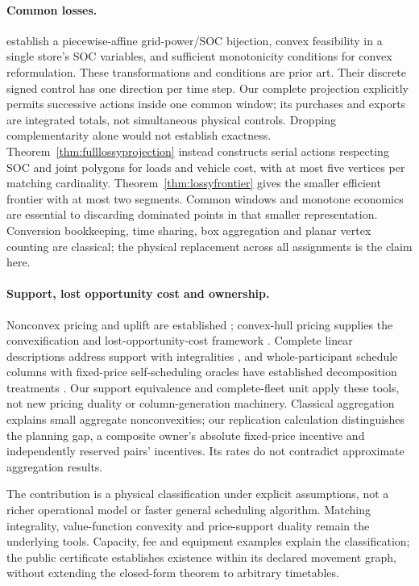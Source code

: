 \paragraph{Common losses.}
\citet[Theorems 1--3]{altahaBitar2024lossy} establish a piecewise-affine
grid-power/SOC bijection, convex feasibility in a single store's SOC variables,
and sufficient monotonicity conditions for convex reformulation. These
transformations and conditions are prior art. Their discrete signed control
has one direction per time step. Our complete projection explicitly permits
successive actions inside one common window; its purchases and exports are
integrated totals, not simultaneous physical controls. Dropping complementarity
alone would not establish exactness. Theorem~\ref{thm:fulllossyprojection}
instead constructs serial actions respecting SOC and joint polygons for
loads and vehicle cost, with at most five vertices per matching cardinality.
Theorem~\ref{thm:lossyfrontier} gives the smaller efficient frontier with at
most two segments. Common windows and monotone economics are essential to
discarding dominated points in that smaller representation. Conversion
bookkeeping, time sharing, box aggregation and planar vertex counting are
classical; the physical replacement across all assignments is the claim here.

\paragraph{Support, lost opportunity cost and ownership.}
Nonconvex pricing and uplift are established
\citep{oneill2005,gribikHoganPope2007}; convex-hull pricing supplies the
convexification and lost-opportunity-cost framework
\citep{schiro2016,huaBaldick2017}. Complete linear descriptions address
support with integralities \citep{huembs2022complete}, and whole-participant
schedule columns with fixed-price self-scheduling oracles have established
decomposition treatments \citep{andrianesis2022hull}. Our support equivalence
and complete-fleet unit apply these tools, not new pricing duality or
column-generation machinery. Classical aggregation
\citep{starr1969,hreinsson2021} explains small aggregate nonconvexities;
our replication calculation distinguishes the planning gap, a composite
owner's absolute fixed-price incentive and independently reserved pairs'
incentives. Its rates do not contradict approximate aggregation results.

The contribution is a physical classification under explicit assumptions,
not a richer operational model or faster general scheduling algorithm.
Matching integrality, value-function convexity and price-support duality
remain the underlying tools. Capacity, fee and equipment examples explain
the classification; the public certificate establishes existence within
its declared movement graph, without extending the closed-form theorem
to arbitrary timetables.
